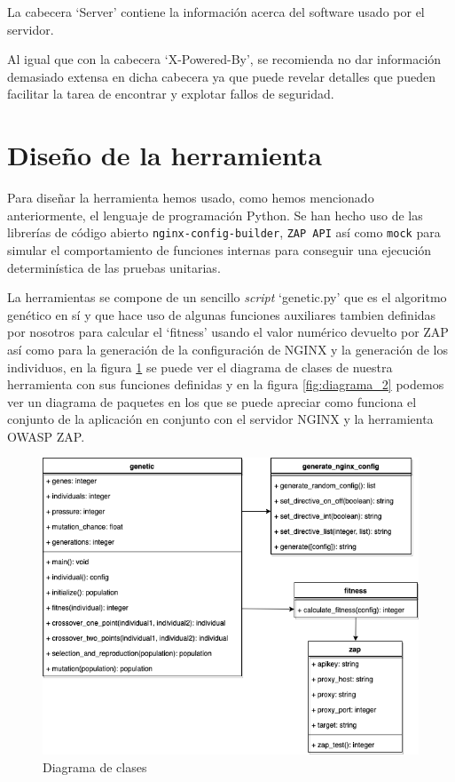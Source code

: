 La cabecera `Server' contiene la información acerca del software usado por el servidor.

\bigskip
Al igual que con la cabecera `X-Powered-By', se recomienda no dar información demasiado extensa en dicha cabecera ya que puede revelar detalles que pueden facilitar la tarea de encontrar y explotar fallos de seguridad.

\section{Diseño de la herramienta}

Para diseñar la herramienta hemos usado, como hemos mencionado anteriormente, el lenguaje de programación Python. Se han hecho uso de las librerías de código abierto \texttt{nginx-config-builder}, \texttt{ZAP API} así como \texttt{mock} para simular el comportamiento de funciones internas para conseguir una ejecución determinística de las pruebas unitarias.

\bigskip
La herramientas se compone de un sencillo \textit{script} `genetic.py' que es el algoritmo genético en sí y que hace uso de algunas funciones auxiliares tambien definidas por nosotros para calcular el `fitness' usando el valor numérico devuelto por ZAP así como para la generación de la configuración de NGINX y la generación de los individuos, en la figura \ref{fig:diagrama_1} se puede ver el diagrama de clases de nuestra herramienta con sus funciones definidas y en la figura \ref{fig:diagrama_2} podemos ver un diagrama de paquetes en los que se puede apreciar como funciona el conjunto de la aplicación en conjunto con el servidor NGINX y la herramienta OWASP ZAP.

\begin{figure}[H]
\centering
\includegraphics[width=1.0\textwidth]{../images/diagrama_1}
\caption{Diagrama de clases}
\label{fig:diagrama_1}
\end{figure}

